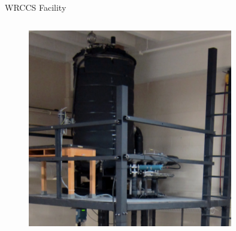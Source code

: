 \documentclass[10pt,t,xcolor=table]{UWMadBeamer}
\begin{document}
\begin{frame}{WRCCS Facility}
    \begin{columns}
        \hfill
        \begin{column}{0.28\paperwidth}
            \begin{figure}
                \centering
                \includegraphics[keepaspectratio,height=0.35\paperheight]{WRCCS_Tank}\\

\end{figure}
\end{column}
\end{columns}
\end{frame}
\end{document}
